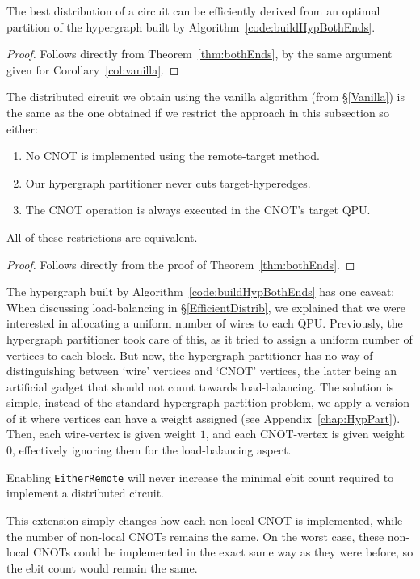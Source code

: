 \begin{corollary}
The best distribution of a circuit can be efficiently derived from an optimal partition of the hypergraph built by Algorithm~\ref{code:buildHypBothEnds}.
\label{col:bothEnds}
\end{corollary}
\begin{proof}
Follows directly from Theorem~\ref{thm:bothEnds}, by the same argument given for Corollary~\ref{col:vanilla}. 

\end{proof}

\begin{corollary}
The distributed circuit we obtain using the vanilla algorithm (from \S\ref{Vanilla}) is the same as the one obtained if we restrict the approach in this subsection so either:
\begin{enumerate}
  \renewcommand{\theenumi}{\alph{enumi})}
  \item No CNOT is implemented using the remote-target method.
  \item Our hypergraph partitioner never cuts target-hyperedges.
  \item The CNOT operation is always executed in the CNOT's target QPU.
\end{enumerate}
All of these restrictions are equivalent.
\end{corollary}
\begin{proof}
Follows directly from the proof of Theorem~\ref{thm:bothEnds}.

\end{proof}

The hypergraph built by Algorithm~\ref{code:buildHypBothEnds} has one caveat: When discussing load-balancing in \S\ref{EfficientDistrib}, we explained that we were interested in allocating a uniform number of wires to each QPU. Previously, the hypergraph partitioner took care of this, as it tried to assign a uniform number of vertices to each block. But now, the hypergraph partitioner has no way of distinguishing between `wire' vertices and `CNOT' vertices, the latter being an artificial gadget that should not count towards load-balancing. The solution is simple, instead of the standard hypergraph partition problem, we apply a version of it where vertices can have a weight assigned (see Appendix~\ref{chap:HypPart}). Then, each wire-vertex is given weight \(1\), and each CNOT-vertex is given weight \(0\), effectively ignoring them for the load-balancing aspect.

\begin{remark} 
Enabling \texttt{EitherRemote} will never increase the minimal ebit count required to implement a distributed circuit.

\normalfont
This extension simply changes how each non-local CNOT is implemented, while the number of non-local CNOTs remains the same. On the worst case, these non-local CNOTs could be implemented in the exact same way as they were before, so the ebit count would remain the same.

\label{thm:BothEndsImprove}
\end{remark}

